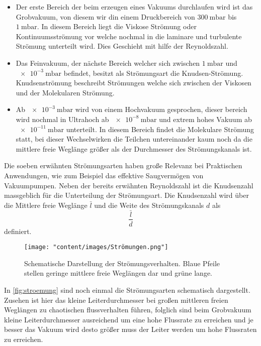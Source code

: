 \begin{itemize}
    \item Der erste Bereich der beim erzeugen eines Vakuums durchlaufen wird ist das Grobvakuum, von diesem wir din einem 
    Druckbereich von $\SI{300}{\milli\bar}$ bis $\SI{1}{\milli\bar}$. In diesem Bereich liegt die Viskose Strömung oder Kontinuumsströmung 
    vor welche nochmal in die laminare und turbulente Strömung unterteilt wird. Dies Geschieht mit hilfe der Reynoldszahl.

    \item Das Feinvakuum, der nächste Bereich welcher sich zwischen $\SI{1}{\milli\bar}$ und $\SI{e-3}{\milli\bar}$ befindet, 
    besitzt als Strömungsart die Knudsen-Strömung. Knudsenströmung beschreibt Strömungen welche sich zwischen der Viskosen und der 
    Molekularen Strömung.

    \item Ab $\SI{e-3}{\milli\bar}$ wird von einem Hochvakuum gesprochen, dieser bereich wird nochmal in Ultrahoch ab $\SI{e-8}{\milli\bar}$ 
    und extrem hohes Vakuum ab $\SI{e-11}{\milli\bar}$ unterteilt. In diesem Bereich findet die Molekulare Strömung statt, bei dieser 
    Wechselwirken die Teilchen untereinander kaum noch da die mittlere freie Weglänge größer als der Durchmesser des Strömungskanals ist.
    
\end{itemize}

Die soeben erwähnten Strömungsarten haben große Relevanz bei Praktischen Anwendungen, wie zum Beispiel das effektive Saugvermögen 
von Vakuumpumpen. Neben der bereits erwähnten Reynoldszahl ist die Knudsenzahl massgeblich für die Unterteilung der Strömungsart.
Die Knudsenzahl wird über die Mittlere freie Weglänge $\bar l$ und die Weite des Strömungskanals $d$ als
\begin {equation}
 \frac{\bar l}{d}
\label{eqn:knudsen}
\end{equation}
definiert.
\begin{figure}[h]
    \centering
    \texttt{[image: "content/images/Strömungen.png"]}
    \caption{Schematische Darstellung der Strömungsverhalten. Blaue Pfeile stellen geringe mittlere freie Weglängen dar und grüne lange. \protect \cite{pfeiffer} }
\label{fig:stroemung}
\end{figure}
In \autoref{fig:stroemung} sind noch einmal die Strömungsarten schematisch dargestellt. Zusehen ist hier das kleine Leiterdurchmesser 
bei großen mittleren freien Weglängen zu chaotischen flussverhalten führen, folglich sind beim Grobvakuum kleine Leiterdurchmesser 
ausreichend um eine hohe Flussrate zu erreichen und je besser das Vakuum wird desto größer muss der Leiter werden um hohe Flussraten 
zu erreichen.

